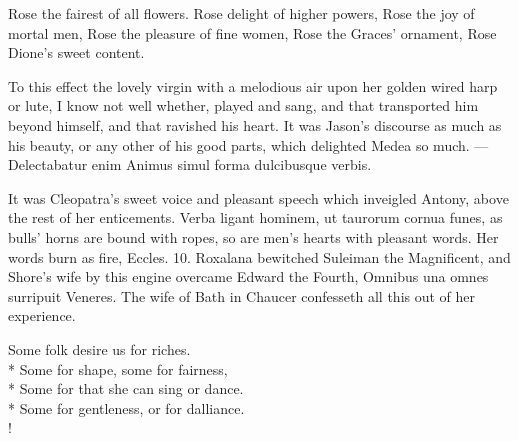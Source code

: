Rose the fairest of all flowers.
Rose delight of higher powers,
Rose the joy of mortal men,
Rose the pleasure of fine women,
Rose the Graces' ornament,
Rose Dione's sweet content.

To this effect the lovely virgin with a melodious air upon her golden
wired harp or lute, I know not well whether, played and sang, and that
transported him beyond himself, and that ravished his heart. It was
Jason's discourse as much as his beauty, or any other of his good
parts, which delighted Medea so much.
---Delectabatur enim
Animus simul forma dulcibusque verbis.

It was Cleopatra's sweet voice and pleasant speech which inveigled
Antony, above the rest of her enticements. Verba ligant hominem, ut
taurorum cornua funes, as bulls' horns are bound with ropes, so are
men's hearts with pleasant words. Her words burn as fire, Eccles. 
10. Roxalana bewitched Suleiman the Magnificent, and Shore's wife by
this engine overcame Edward the Fourth, Omnibus una omnes
surripuit Veneres. The wife of Bath in Chaucer confesseth all this out
of her experience.
%
{\gothfont%
\begin{versewithlinenos}{2}{1}{1}%
Some folk desire us for riches.\\*
Some for shape, some for fairness,\\*
Some for that she can sing or dance.\\*
Some for gentleness, or for dalliance.\\!
\end{versewithlinenos}%
}%

